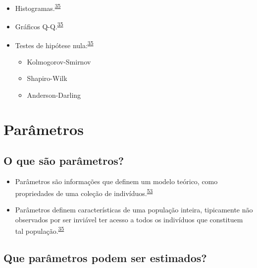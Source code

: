 \documentclass[
  a4paper,
]{book}
\begin{document}
\begin{itemize}
\item
  Histogramas.\textsuperscript{\protect\hyperlink{ref-vetter2017}{35}}
\item
  Gráficos Q-Q.\textsuperscript{\protect\hyperlink{ref-vetter2017}{35}}
\item
  Testes de hipótese nula:\textsuperscript{\protect\hyperlink{ref-vetter2017}{35}}

  \begin{itemize}
  \item
    Kolmogorov-Smirnov
  \item
    Shapiro-Wilk
  \item
    Anderson-Darling
  \end{itemize}
\end{itemize}

\hypertarget{parametros}{%
\section{Parâmetros}\label{parametros}}

\hypertarget{o-que-suxe3o-paruxe2metros}{%
\subsection{O que são parâmetros?}\label{o-que-suxe3o-paruxe2metros}}

\begin{itemize}
\item
  Parâmetros são informações que definem um modelo teórico, como propriedades de uma coleção de indivíduos.\textsuperscript{\protect\hyperlink{ref-Altman1999}{53}}
\item
  Parâmetros definem características de uma população inteira, tipicamente não observados por ser inviável ter acesso a todos os indivíduos que constituem tal população.\textsuperscript{\protect\hyperlink{ref-vetter2017}{35}}
\end{itemize}

\hypertarget{que-paruxe2metros-podem-ser-estimados}{%
\subsection{Que parâmetros podem ser estimados?}\label{que-paruxe2metros-podem-ser-estimados}}
\end{document}
